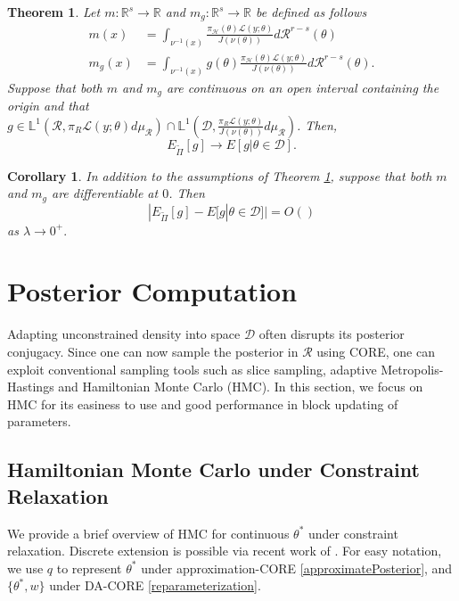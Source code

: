 \documentclass[10pt,fleqn]{article}
\newtheorem{theorem}{Theorem}
\newtheorem{corollary}{Corollary}
\newcommand{\mc}[1]{\mathcal{#1}}
\DeclareMathOperator{\1}{\mathbbm{1}}
\begin{document}
{\begin{theorem}
\label{THM:Relaxed_Expectation_Convergence_Measure_Zero}
Let $m:\mathbb{R}^s\to \mathbb{R}$ and $m_g:\mathbb{R}^s\to \mathbb{R}$ be defined as follows
\begin{align*}
m(x) &= \int_{\nu^{-1}(x)} \frac{\pi_\mathcal{H}(\theta) \mathcal{L}(y;\theta)}{J(\nu(\theta))} d\mathcal{R}^{r-s}(\theta) \\
m_g(x) &= \int_{\nu^{-1}(x)} g(\theta)\frac{\pi_\mathcal{H}(\theta) \mathcal{L}(y;\theta)}{J(\nu(\theta))} d\mathcal{R}^{r-s}(\theta).
\end{align*}
Suppose that both $m$ and $m_g$ are continuous on an open interval containing the origin and that \\ $g\in\mathbb{L}^1(\mathcal{R},\pi_R\mathcal{L}(y;\theta)d\mu_\mathcal{R}) \cap\mathbb{L}^1(\mathcal{D},\frac{\pi_R\mathcal{L}(y;\theta)}{J(\nu(\theta))}d\mu_\mathcal{R})$. Then,
$$E_{\tilde{\Pi}}[g] \to E[g|\theta \in \mathcal{D}].$$
\end{theorem}

\begin{corollary}
In addition to the assumptions of Theorem \ref{THM:Relaxed_Expectation_Convergence_Measure_Zero}, suppose that both $m$ and $m_g$ are differentiable at $0$. Then
$$|E_{\tilde{\Pi}}[g] - E[g|\theta \in \mathcal{D}] | = O()$$
as $\lambda \to 0^+.$
\end{corollary}

}
 
\section{Posterior Computation}

Adapting  unconstrained density into space $\mc D$ often disrupts its posterior conjugacy. Since one can now sample the posterior in $\mc R$ using
 CORE, one can exploit conventional sampling tools such as slice sampling, adaptive Metropolis-Hastings and Hamiltonian Monte Carlo (HMC). In this section, we focus on HMC for its easiness to use and good performance in block updating of parameters.

\subsection{Hamiltonian Monte Carlo under Constraint Relaxation}

We provide a brief overview of HMC for continuous $\theta^*$ under constraint relaxation. Discrete extension is possible via recent work of \cite{nishimura2017discontinuous}. For easy notation, we use $q$ to represent $\theta^*$ under approximation-CORE \eqref{approximatePosterior}, and $\{\theta^*, w\}$ under DA-CORE \eqref{reparameterization}.
\end{document}
